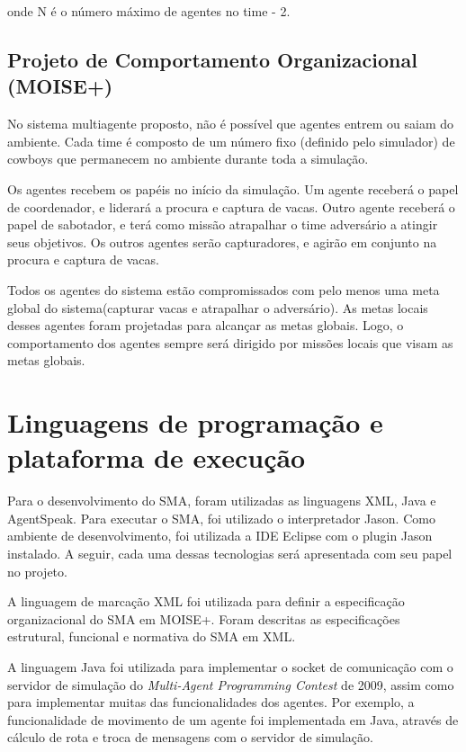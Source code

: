 \documentclass{llncs}
\begin{document}
onde N é o número máximo de agentes no time - 2.

\subsection{Projeto de Comportamento Organizacional (MOISE+)}

No sistema multiagente proposto, não é possível que agentes entrem ou saiam do ambiente. Cada time é composto de um número fixo (definido pelo simulador) de cowboys que permanecem no ambiente durante toda a simulação.

Os agentes recebem os papéis no início da simulação. Um agente receberá o papel de coordenador, e liderará a procura e captura de vacas. Outro agente receberá o papel de sabotador, e terá como missão atrapalhar o time adversário a atingir seus objetivos. Os outros agentes serão capturadores, e agirão em conjunto na procura e captura de vacas.

Todos os agentes do sistema estão compromissados com pelo menos uma meta global do sistema(capturar vacas e atrapalhar o adversário). As metas locais desses agentes foram projetadas para alcançar as metas globais. Logo, o comportamento dos agentes sempre será dirigido por missões locais que visam as metas globais.


\section{Linguagens de programação e plataforma de execução}


Para o desenvolvimento do SMA, foram utilizadas as linguagens XML, Java e AgentSpeak. Para executar o SMA, foi utilizado o interpretador Jason. Como ambiente de desenvolvimento, foi utilizada a IDE Eclipse com o plugin Jason instalado. A seguir, cada uma dessas tecnologias será apresentada com seu papel no projeto.

A linguagem de marcação XML foi utilizada para definir a especificação organizacional do SMA em MOISE+. Foram descritas as especificações estrutural, funcional e normativa do SMA em XML.

A linguagem Java foi utilizada para implementar o socket de comunicação com o servidor de simulação do \textit{Multi-Agent Programming Contest} de 2009, assim como para implementar muitas das funcionalidades dos agentes. Por exemplo, a funcionalidade de movimento de um agente foi implementada em Java, através de cálculo de rota e troca de mensagens com o servidor de simulação.
\end{document}
